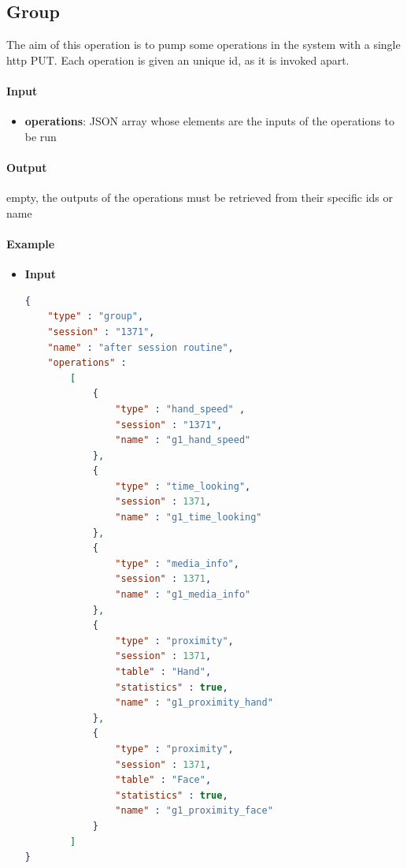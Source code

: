 \documentclass[a4paper,notitlepage,onecolumn]{hitec}  %
\begin{document}
\subsection{Group}
The aim of this operation is to pump some operations in the system with a single http PUT. Each operation is given an unique id, as it is invoked apart.

\paragraph{Input}
\begin{itemize}
\item\textbf{operations}: JSON array whose elements are the inputs of the operations to be run
\end{itemize}

\paragraph{Output}
empty, the outputs of the operations must be retrieved from their specific ids or name

\paragraph{Example}
\begin{itemize}
\item\textbf{Input}
\begin{lstlisting}[language=json,firstnumber=1]
{
    "type" : "group",
    "session" : "1371",
    "name" : "after session routine",
    "operations" : 
        [
            {
                "type" : "hand_speed" ,
                "session" : "1371",
                "name" : "g1_hand_speed"
            },
            {
                "type" : "time_looking",
                "session" : 1371,
                "name" : "g1_time_looking"
            },
            {
                "type" : "media_info",
                "session" : 1371,
                "name" : "g1_media_info"
            },
            {
                "type" : "proximity",
                "session" : 1371,
                "table" : "Hand",
                "statistics" : true,
                "name" : "g1_proximity_hand"
            },
            {
                "type" : "proximity",
                "session" : 1371,
                "table" : "Face",
                "statistics" : true,
                "name" : "g1_proximity_face"
            }
        ]   
}
\end{lstlisting}
\end{itemize}
\end{document}

